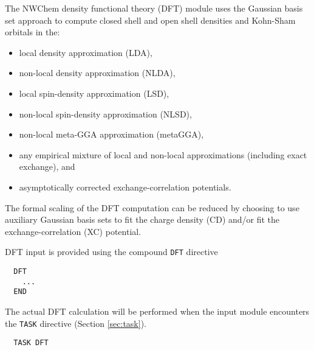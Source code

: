 %
%
\label{sec:dft}

The NWChem density functional theory (DFT) module uses the
Gaussian basis set approach to compute
closed shell and open shell densities and Kohn-Sham orbitals
in the: 
\begin{itemize}
\item local density approximation (LDA), 
\item non-local density approximation (NLDA), 
\item local spin-density approximation (LSD), 
\item non-local spin-density approximation (NLSD),
\item non-local meta-GGA approximation (metaGGA),
\item any empirical mixture of local and non-local approximations
(including exact exchange), and
\item asymptotically corrected exchange-correlation potentials.
\end{itemize}

The formal scaling of the DFT computation can be reduced by choosing
to use auxiliary Gaussian basis sets to fit the charge density (CD) and/or 
fit the exchange-correlation (XC) potential.

DFT input is provided using the compound \verb+DFT+ directive
\begin{verbatim}
  DFT
    ...
  END
\end{verbatim}
The actual DFT calculation will be performed when the input module
encounters the \verb+TASK+ directive (Section \ref{sec:task}).  
\begin{verbatim}
  TASK DFT
\end{verbatim}


